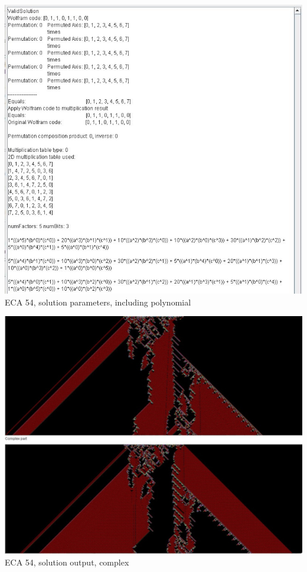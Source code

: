\documentclass[11pt]{article}
\begin{document}
\begin{center}
\includegraphics{FiftyFourText.jpg}
ECA 54, solution parameters, including polynomial

\includegraphics{FiftyFourComplexSmall.jpg}
ECA 54, solution output, complex
\end{center}
\medskip


\end{document}
